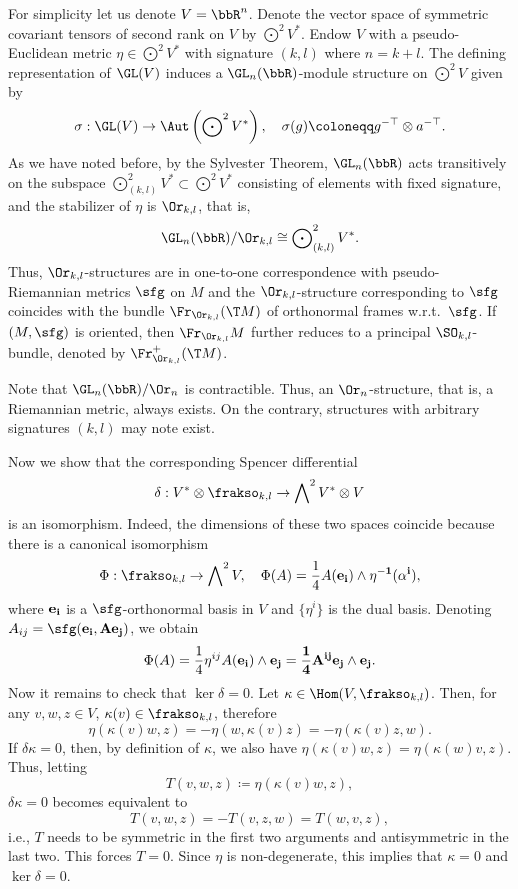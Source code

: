 \begin{example}\label{ex pseudo-riemannian structure}
    For simplicity let us denote $V=\bbR^n$. Denote the vector space of symmetric covariant tensors of second rank on $V$ by $\bigodot\nolimits^2V^\ast$. Endow $V$ with a pseudo-Euclidean metric $\eta\in \bigodot\nolimits^2V^\ast$ with signature $(k,l)$ where $n=k+l$. The defining representation of $\GL(V)$ induces a $\GL_n(\bbR)$-module structure on $\bigodot\nolimits^2 V$ given by 
    \[\sigma:\GL(V)\to \Aut\left(\bigodot\nolimits^2 V^\ast\right),\quad \sigma(g)\coloneqq g^{-\top}\otimes a^{-\top}.\label{eq 2.2.21 RS2}\]
    As we have noted before, by the Sylvester Theorem, $\GL_n(\bbR)$ acts transitively on the subspace $\bigodot\nolimits^2_{(k,l)}V^\ast\subset \bigodot\nolimits^2 V^\ast$ consisting of elements with fixed signature, and the stabilizer of $\eta$ is $\Or_{k,l}$, that is,
    \[\GL_n(\bbR)\slash \Or_{k,l}\cong \bigodot\nolimits^2_{(k,l)}V^\ast.\]
    Thus, $\Or_{k,l}$-structures are in one-to-one correspondence with pseudo-Riemannian metrics $\sfg$ on $M$ and the $\Or_{k,l}$-structure corresponding to $\sfg$ coincides with the bundle $\Fr_{\Or_{k,l}}(\T M)$ of orthonormal frames w.r.t.\ $\sfg$. If $(M,\sfg)$ is oriented, then $\Fr_{\Or_{k,l}}M$ further reduces to a principal $\SO_{k,l}$-bundle, denoted by $\Fr^+_{\Or_{k,l}}(\T M)$. 
    
    Note that $\GL_n(\bbR)\slash \Or_n$ is contractible. Thus, an $\Or_n$-structure, that is, a Riemannian metric, always exists. On the contrary, structures with arbitrary signatures $(k,l)$ may note exist. 
    
    Now we show that the corresponding Spencer differential 
    \[\delta: V^\ast\otimes \frakso_{k,l}\to \bigwedge\nolimits^2 V^\ast\otimes V\]
    is an isomorphism. Indeed, the dimensions of these two spaces coincide because there is a canonical isomorphism 
    \[\Phi: \frakso_{k,l}\to \bigwedge\nolimits^2 V,\quad \Phi(A)= \frac14 A(\bf{e}_i)\wedge \eta^{-1}(\alpha^i),\]
    where $\bf{e}_i$ is a $\sfg$-orthonormal basis in $V$ and $\{\eta^i\}$ is the dual basis. Denoting $A_{ij}=\sfg(\bf{e}_i,A\bf{e}_j)$, we obtain 
    \[\Phi(A)=\frac14 \eta^{ij}A(\bf{e}_i)\wedge\bf{e}_j=\frac14 A^{ij}\bf{e}_j\wedge\bf{e}_j.\]
    Now it remains to check that $\ker\delta=0$. Let $\kappa\in \Hom(V,\frakso_{k,l})$. Then, for any $v,w,z\in V$, $\kappa(v)\in\frakso_{k,l}$, therefore 
    \[\eta(\kappa(v)w,z)=-\eta(w,\kappa(v)z)=-\eta(\kappa(v)z,w).\]
    If $\delta\kappa=0$, then, by definition of $\kappa$, we  also have $\eta(\kappa(v)w,z)=\eta(\kappa(w)v,z)$. Thus, letting
    \[T(v,w,z)\coloneqq \eta(\kappa(v)w,z),\]
    $\delta\kappa=0$ becomes equivalent to 
    \[T(v,w,z)=-T(v,z,w)=T(w,v,z),\]
    i.e., $T$ needs to be symmetric in the first two arguments and antisymmetric in the last two. This forces $T=0$. Since $\eta$ is non-degenerate, this implies that $\kappa=0$ and $\ker\delta=0$. 
    

\end{example}
